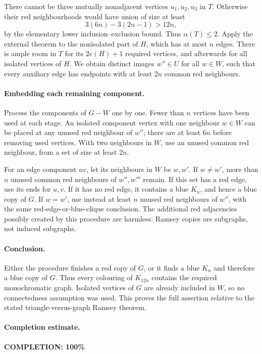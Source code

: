 There cannot be three mutually nonadjacent vertices
\(u_1,u_2,u_3\) in \(T\). Otherwise their red neighbourhoods
would have union of size at least
\[
 3(6n)-3(2n-1)>12n,
\]
by the elementary lower inclusion--exclusion bound.
Thus \(\alpha(T)\leq2\).
Apply the external theorem to the nonisolated part of \(H\),
which has at most \(n\) edges.
There is ample room in \(T\) for its \(2e(H)+1\) required
vertices, and afterwards for all isolated vertices of \(H\).
We obtain distinct images \(w''\in U\) for all \(w\in W\),
such that every auxiliary edge has endpoints with
at least \(2n\) common red neighbours.

\paragraph{Embedding each remaining component.}
Process the components of \(G-W\) one by one.
Fewer than \(n\) vertices have been used at each stage.
An isolated component vertex with one neighbour \(w\in W\)
can be placed at any unused red neighbour of \(w''\);
there are at least \(6n\) before removing used vertices.
With two neighbours in \(W\), use an unused common red
neighbour, from a set of size at least \(2n\).

For an edge component \(uv\), let its neighbours in \(W\)
be \(w,w'\).
If \(w\ne w'\), more than \(n\) unused common red neighbours
of \(w'',w'''\) remain.
If this set has a red edge, use its ends for \(u,v\).
If it has no red edge, it contains a blue \(K_n\),
and hence a blue copy of \(G\).
If \(w=w'\), use instead at least \(n\) unused red neighbours
of \(w''\), with the same red-edge-or-blue-clique conclusion.
The additional red adjacencies possibly created by this
procedure are harmless: Ramsey copies are subgraphs,
not induced subgraphs.

\paragraph{Conclusion.}
Either the procedure finishes a red copy of \(G\), or it
finds a blue \(K_n\) and therefore a blue copy of \(G\).
Thus every colouring of \(K_{12n}\) contains the required
monochromatic graph. Isolated vertices of \(G\) are already
included in \(W\), so no connectedness assumption was used.
This proves the full assertion relative to the stated
triangle-versus-graph Ramsey theorem.

\paragraph{Completion estimate.}
\textbf{COMPLETION: 100\%}

